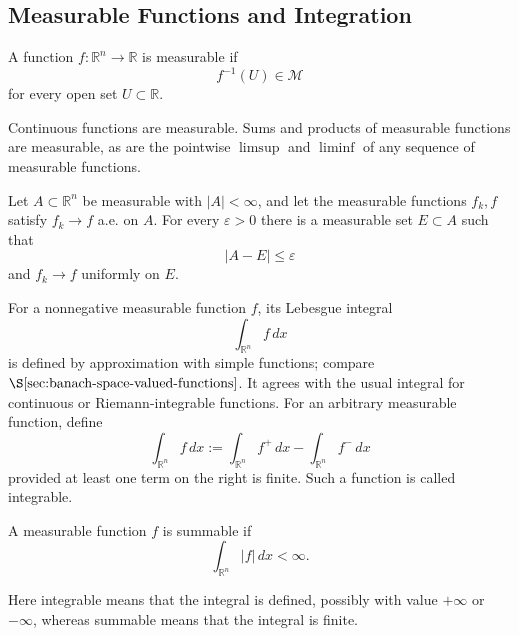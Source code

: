 \subsection{Measurable Functions and Integration}
\label{sec:measurable-functions-integration}

\begin{definition}
\label{def:measurable-function}
A function $f:\mathbb R^n\to\mathbb R$ is measurable if
\[
f^{-1}(U)\in\mathcal M
\]
for every open set $U\subset\mathbb R$.
\end{definition}

Continuous functions are measurable. Sums and products of measurable functions
are measurable, as are the pointwise $\limsup$ and $\liminf$ of any sequence of
measurable functions.

\begin{theorem}
\label{thm:egoroffs-theorem}
Let $A\subset\mathbb R^n$ be measurable with $|A|<\infty$, and let the
measurable functions $f_k,f$ satisfy $f_k\to f$ a.e. on $A$. For every
$\varepsilon>0$ there is a measurable set $E\subset A$ such that
\[
|A-E|\leq\varepsilon
\]
and $f_k\to f$ uniformly on $E$.
\end{theorem}

For a nonnegative measurable function $f$, its Lebesgue integral
\[
\int_{\mathbb R^n}f\,dx
\]
is defined by approximation with simple functions; compare
$\S\ref{sec:banach-space-valued-functions}$. It agrees with the usual integral
for continuous or Riemann-integrable functions. For an arbitrary measurable
function, define
\[
\int_{\mathbb R^n}f\,dx
:=\int_{\mathbb R^n}f^+\,dx-\int_{\mathbb R^n}f^-\,dx
\]
provided at least one term on the right is finite. Such a function is called
integrable.

\begin{definition}
\label{def:summable-function}
A measurable function $f$ is summable if
\[
\int_{\mathbb R^n}|f|\,dx<\infty.
\]
\end{definition}

\begin{remark}
\label{rem:integrable-vs-summable-terminology}
Here integrable means that the integral is defined, possibly with value
$+\infty$ or $-\infty$, whereas summable means that the integral is finite.
\end{remark}

